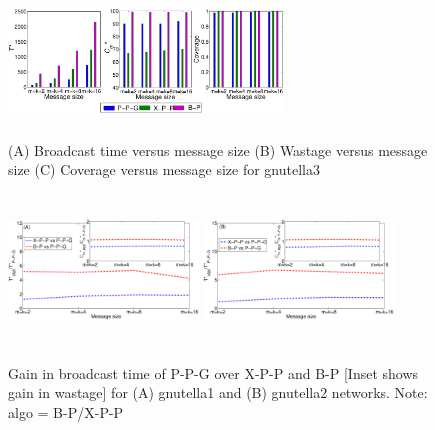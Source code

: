 \begin{figure}[!ht]
  \centering	
 \includegraphics*[width=0.65\textwidth,height=40mm,angle=0]{./texfiles/Chapter_3/netsci/figs1/gnutella25_bt_wa_co.eps}
 
 \caption{\label{gnutellacomp} (A) Broadcast time versus message size (B) Wastage versus message size (C) Coverage versus message size for gnutella3}
\end{figure}


\begin{figure}[!ht]
  \centering	
 \includegraphics*[width=0.45\textwidth,height=40mm,angle=0]{./texfiles/Chapter_3/netsci/figs1/comp_gnut_4.eps}
 \includegraphics*[width=0.45\textwidth,height=40mm,angle=0]{./texfiles/Chapter_3/netsci/figs1/comp_gnut_6.eps}
 
 \caption{\label{gnutellacomp1} Gain in broadcast time of P-P-G over X-P-P and B-P [Inset shows gain in wastage] for (A) gnutella1 and (B) gnutella2 networks. Note: algo = B-P/X-P-P }
\vspace{.5cm}
 \end{figure}
%  

